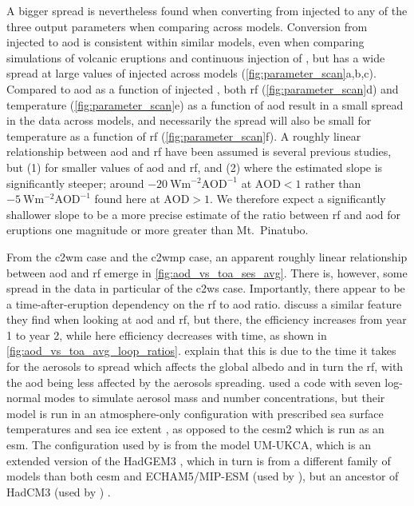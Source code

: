 \documentclass{ametsocV6.1}
\newcommand{\iso}[1][i]{{#1}njected \ce{SO2}}
\begin{document}
A bigger spread is nevertheless found when converting from \iso{} to any of the three
output parameters when comparing across models. Conversion from \iso{} to \gls{aod} is
consistent within similar models, even when comparing simulations of volcanic eruptions
\citep{timmreck2010} and continuous injection of  \citep{niemeier2015}, but has
a wide spread at large values of \iso{} across models (\ref{fig:parameter_scan}a,b,c).
Compared to \gls{aod} as a function of \iso{}, both \gls{rf} (\ref{fig:parameter_scan}d)
and temperature (\ref{fig:parameter_scan}e) as a function of \gls{aod} result in a small
spread in the data across models, and necessarily the spread will also be small for
temperature as a function of \gls{rf} (\ref{fig:parameter_scan}f). A roughly linear
relationship between \gls{aod} and \gls{rf} have been assumed is several previous
studies, but (1) for smaller values of \gls{aod} and \gls{rf}, and (2) where the
estimated slope is significantly steeper; around
\(\SI{-20}{\watt\metre^{-2}\mathrm{AOD}^{-1}}\) at \(\mathrm{AOD}<1\) rather than
\(\SI{-5}{\watt\metre^{-2}\mathrm{AOD}^{-1}}\) found here at \(\mathrm{AOD}>1\). We
therefore expect a significantly shallower slope to be a more precise estimate of the
ratio between \gls{rf} and \gls{aod} for eruptions one magnitude or more greater than
Mt.\ Pinatubo.

From the \gls{c2wm} case and the \gls{c2wmp} case, an apparent roughly linear
relationship between \gls{aod} and \gls{rf} emerge in \ref{fig:aod_vs_toa_ses_avg}.
There is, however, some spread in the data in particular of the \gls{c2ws} case.
Importantly, there appear to be a time-after-eruption dependency on the \gls{rf} to
\gls{aod} ratio. \citet{marshall2020} discuss a similar feature they find when looking
at \gls{aod} and \gls{rf}, but there, the efficiency increases from year 1 to year 2,
while here efficiency decreases with time, as shown in
\ref{fig:aod_vs_toa_avg_loop_ratios}. \citet{marshall2020} explain that this is due to
the time it takes for the aerosols to spread which affects the global albedo and in turn
the \gls{rf}, with the \gls{aod} being less affected by the aerosols spreading.
\citet{marshall2019, marshall2020, marshall2021} used a code with seven log-normal modes
to simulate aerosol mass and number concentrations, but their model is run in an
atmosphere-only configuration with prescribed sea surface temperatures and sea ice
extent \citep{marshall2019}, as opposed to the \gls{cesm2} which is run as an \gls{esm}.
The configuration used by \citet{marshall2019} is from the model UM-UKCA, which is an
extended version of the HadGEM3 \citep{dhomse2014}, which in turn is from a different
family of models than both \gls{cesm} and ECHAM5/MIP-ESM (used by
\citet{timmreck2010,niemeier2015}), but an ancestor of HadCM3 (used by
\citet{gregory2016}) \citep{kuma2023}.
\end{document}
